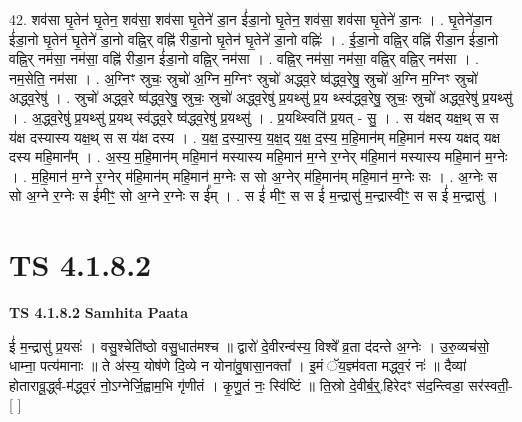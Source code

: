 \documentclass[17pt]{extarticle}
\begin{document}
42. शव॑सा घृ॒तेन॑ घृ॒तेन॒ शव॑सा॒ शव॑सा घृ॒तेने॑ डा॒न ई॑डा॒नो घृ॒तेन॒ शव॑सा॒ शव॑सा घृ॒तेने॑ डा॒नः । . घृ॒तेने॑डा॒न ई॑डा॒नो घृ॒तेन॑ घृ॒तेने॑ डा॒नो वह्नि॒र् वह्नि॑ रीडा॒नो घृ॒तेन॑ घृ॒तेने॑ डा॒नो वह्निः॑ । . ई॒डा॒नो वह्नि॒र् वह्नि॑ रीडा॒न ई॑डा॒नो वह्नि॒र् नम॑सा॒ नम॑सा॒ वह्नि॑ रीडा॒न ई॑डा॒नो वह्नि॒र् नम॑सा । . वह्नि॒र् नम॑सा॒ नम॑सा॒ वह्नि॒र् वह्नि॒र् नम॑सा । . नम॒सेति॒ नम॑सा । . अ॒ग्निꣳ स्रुचः॒ स्रुचो॑ अ॒ग्नि म॒ग्निꣳ स्रुचो॑ अद्ध्व॒रे ष्व॑द्ध्व॒रेषु॒ स्रुचो॑ अ॒ग्नि म॒ग्निꣳ स्रुचो॑ अद्ध्व॒रेषु॑ । . स्रुचो॑ अद्ध्व॒रे ष्व॑द्ध्व॒रेषु॒ स्रुचः॒ स्रुचो॑ अद्ध्व॒रेषु॑ प्र॒यथ्सु॑ प्र॒य थ्स्व॑द्ध्व॒रेषु॒ स्रुचः॒ स्रुचो॑ अद्ध्व॒रेषु॑ प्र॒यथ्सु॑ । . अ॒द्ध्व॒रेषु॑ प्र॒यथ्सु॑ प्र॒यथ् स्व॑द्ध्व॒रे ष्व॑द्ध्व॒रेषु॑ प्र॒यथ्सु॑ । . प्र॒यथ्स्विति॑ प्र॒यत् - सु॒ । . स य॑क्षद् यक्ष॒थ् स स य॑क्ष दस्यास्य यक्ष॒थ् स स य॑क्ष दस्य । . य॒क्ष॒ द॒स्या॒स्य॒ य॒क्ष॒द् य॒क्ष॒ द॒स्य॒ म॒हि॒मान॑म् महि॒मान॑ मस्य यक्षद् यक्ष दस्य महि॒मान᳚म् । . अ॒स्य॒ म॒हि॒मान॑म् महि॒मान॑ मस्यास्य महि॒मान॑ म॒ग्ने र॒ग्नेर् म॑हि॒मान॑ मस्यास्य महि॒मान॑ म॒ग्नेः । . म॒हि॒मान॑ म॒ग्ने र॒ग्नेर् म॑हि॒मान॑म् महि॒मान॑ म॒ग्नेः स सो अ॒ग्नेर् म॑हि॒मान॑म् महि॒मान॑ म॒ग्नेः सः । . अ॒ग्नेः स सो अ॒ग्ने र॒ग्नेः स ई॑मीꣳ॒॒ सो अ॒ग्ने र॒ग्नेः स ई᳚म् । . स ई॑ मीꣳ॒॒ स स ई॑ म॒न्द्रासु॑ म॒न्द्रास्वीꣳ॒॒ स स ई॑ म॒न्द्रासु॑ । \newline
\pagebreak
{}

\section{ TS 4.1.8.2 }

\textbf{TS 4.1.8.2 } \newline
\textbf{Samhita Paata} \newline

ई॑ म॒न्द्रासु॑ प्र॒यसः॑ । वसु॒श्चेति॑ष्ठो वसु॒धात॑मश्च ॥ द्वारो॑ दे॒वीरन्व॑स्य॒ विश्वे᳚ व्र॒ता द॑दन्ते अ॒ग्नेः । उ॒रु॒व्यच॑सो॒ धाम्ना॒ पत्य॑मानाः ॥ ते अ॑स्य॒ योष॑णे दि॒व्ये न योना॑वु॒षासा॒नक्ता᳚ । इ॒मं ॅय॒ज्ञ्म॑वता मद्ध्व॒रं नः॑ ॥ दैव्या॑ होतारावू॒र्द्ध्व-म॑द्ध्व॒रं नो॒ऽग्नेर्जि॒ह्वाम॒भि गृ॑णीतं । कृ॒णु॒तं नः॒ स्वि॑ष्टिं ॥ ति॒स्रो दे॒वीर्ब॒र्॒.हिरेदꣳ स॑द॒न्त्विडा॒ सर॑स्वती॒- [  ] \newline
\end{document}
